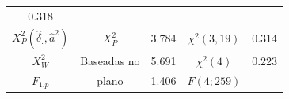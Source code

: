 \documentclass[]{book}
\theoremstyle{definition}
\theoremstyle{definition}
\theoremstyle{definition}
\theoremstyle{remark}
\begin{document}
\begin{longtable}[]{@{}cclcr@{}}
\begin{minipage}[t]{0.07\columnwidth}
0.318\strut
\end{minipage}\tabularnewline
\begin{minipage}[t]{0.40\columnwidth}\centering\strut
\(X_{P}^{2}\left( \hat{\delta}_{.},\hat{a}^{2}\right)\)\strut
\end{minipage} & \begin{minipage}[t]{0.15\columnwidth}\centering\strut
\(X_{P}^{2}\)\strut
\end{minipage} & \begin{minipage}[t]{0.05\columnwidth}\raggedright\strut
3.784\strut
\end{minipage} & \begin{minipage}[t]{0.19\columnwidth}\centering\strut
\(\chi ^{2}(3,19)\)\strut
\end{minipage} & \begin{minipage}[t]{0.07\columnwidth}\raggedleft\strut
0.314\strut
\end{minipage}\tabularnewline
\begin{minipage}[t]{0.40\columnwidth}\centering\strut
\(X_{W}^{2}\)\strut
\end{minipage} & \begin{minipage}[t]{0.15\columnwidth}\centering\strut
Baseadas no\strut
\end{minipage} & \begin{minipage}[t]{0.05\columnwidth}\raggedright\strut
5.691\strut
\end{minipage} & \begin{minipage}[t]{0.19\columnwidth}\centering\strut
\(\chi ^{2}(4)\)\strut
\end{minipage} & \begin{minipage}[t]{0.07\columnwidth}\raggedleft\strut
0.223\strut
\end{minipage}\tabularnewline
\begin{minipage}[t]{0.40\columnwidth}\centering\strut
\(F_{1.p}\)\strut
\end{minipage} & \begin{minipage}[t]{0.15\columnwidth}\centering\strut
plano\strut
\end{minipage} & \begin{minipage}[t]{0.05\columnwidth}\raggedright\strut
1.406\strut
\end{minipage} & \begin{minipage}[t]{0.19\columnwidth}\centering\strut
\(F\left( 4;259\right)\)\strut
\end{minipage} & \begin{minipage}[t]{0.07\columnwidth}\raggedleft\strut

\end{minipage}
\end{longtable}
\end{document}
